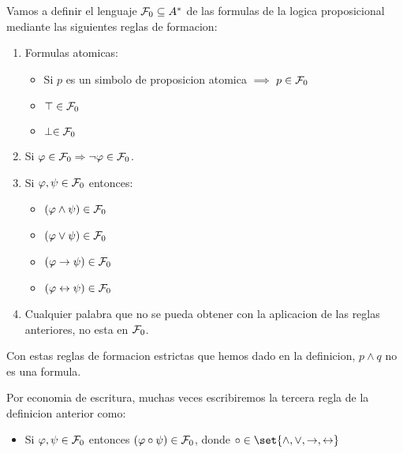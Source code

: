 \begin{definition}
	Vamos a definir el lenguaje \(\mathcal{\MakeUppercase{f}}_0 \subseteq A^{* } \) de las formulas de la logica proposicional mediante las siguientes reglas de formacion:
	\begin{enumerate}
		\item Formulas atomicas: \begin{itemize}
			      \item Si \(p \) es un simbolo de proposicion atomica \(\implies \) \(p \in \mathcal{\MakeUppercase{f}}_0 \)
			      \item \(\top \in \mathcal{\MakeUppercase{f}}_0 \)
			      \item \(\perp \in \mathcal{\MakeUppercase{f}}_0 \)
		      \end{itemize}

		\item Si \(\varphi \in \mathcal{\MakeUppercase{f}}_0  \Rightarrow \neg \varphi \in \mathcal{\MakeUppercase{f}}_0\).
		\item Si \(\varphi, \psi \in \mathcal{\MakeUppercase{f}}_0 	\) entonces: \begin{itemize}
			      \item \((\varphi \wedge \psi) \in \mathcal{\MakeUppercase{f}}_0\)
			      \item \((\varphi \vee \psi) \in \mathcal{\MakeUppercase{f}}_0\)
			      \item \((\varphi \rightarrow \psi ) \in \mathcal{\MakeUppercase{f}}_0 \)
			      \item \((\varphi \leftrightarrow \psi ) \in \mathcal{\MakeUppercase{f}}_0 \)
		      \end{itemize}
		\item Cualquier palabra que no se pueda obtener con la aplicacion de las reglas anteriores, no esta en \(\mathcal{\MakeUppercase{f}}_0 \).
	\end{enumerate}
\end{definition}
\begin{remark}
	Con estas reglas de formacion estrictas que hemos dado en la definicion, \(p \wedge  q \) no es una formula.
\end{remark}
\begin{remark}
	Por economia de escritura, muchas veces escribiremos la tercera regla de la definicion anterior como:
	\begin{itemize}
		\item Si \(\varphi, \psi \in \mathcal{\MakeUppercase{f}}_0 \) entonces \((\varphi \circ \psi) \in \mathcal{\MakeUppercase{f}}_0 \), donde \(\circ \in \set{\wedge,\vee,\rightarrow, \leftrightarrow}\)
	\end{itemize}
\end{remark}

